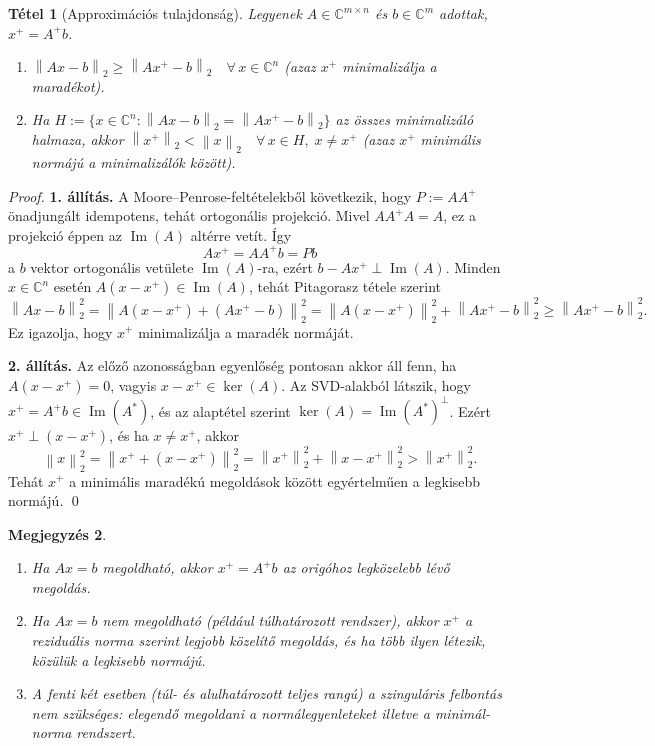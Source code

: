 \documentclass[a4paper,12pt]{article}
\theoremstyle{mydef}
\newtheorem{tetel}{Tétel}[section]
\newtheorem{megjegyzes}[tetel]{Megjegyzés}
\newcommand{\C}{\mathbb{C}}
\newcommand{\norm}[1]{\left\|#1\right\|}
\DeclareMathOperator{\Ker}{ker}
\DeclareMathOperator{\Kep}{Im}
\begin{document}
\begin{mdframed}[backgroundcolor=thmbg,linewidth=0pt,innertopmargin=8pt,innerbottommargin=8pt]
\begin{tetel}[Approximációs tulajdonság]
\label{tetel:approx}
Legyenek $A \in \C^{m\times n}$ és $b \in \C^m$ adottak, $x^+ = A^+b$.
\begin{enumerate}[noitemsep,topsep=2pt]
  \item $\norm{Ax - b}_2 \ge \norm{Ax^+ - b}_2 \quad \forall\,x \in \C^n$
        (azaz $x^+$ minimalizálja a maradékot).
  \item Ha $H := \{x \in \C^n : \norm{Ax - b}_2 = \norm{Ax^+ - b}_2\}$ az összes
        minimalizáló halmaza, akkor
        $\norm{x^+}_2 < \norm{x}_2 \quad \forall\,x \in H,\; x \ne x^+$
        (azaz $x^+$ minimális normájú a minimalizálók között).
\end{enumerate}
\end{tetel}
\end{mdframed}

\begin{proof}
\textbf{1. állítás.}
A Moore--Penrose-feltételekből következik, hogy $P:=AA^+$ önadjungált idempotens,
tehát ortogonális projekció. Mivel $AA^+A=A$, ez a projekció éppen az $\Kep(A)$ altérre
vetít. Így
\[
  Ax^+ = AA^+b = Pb
\]
a $b$ vektor ortogonális vetülete $\Kep(A)$-ra, ezért $b-Ax^+\perp\Kep(A)$.
Minden $x\in\C^n$ esetén $A(x-x^+)\in\Kep(A)$, tehát Pitagorasz tétele szerint
\[
  \norm{Ax-b}_2^2
  = \norm{A(x-x^+) + (Ax^+-b)}_2^2
  = \norm{A(x-x^+)}_2^2 + \norm{Ax^+-b}_2^2
  \ge \norm{Ax^+-b}_2^2.
\]
Ez igazolja, hogy $x^+$ minimalizálja a maradék normáját.

\textbf{2. állítás.}
Az előző azonosságban egyenlőség pontosan akkor áll fenn, ha
$A(x-x^+)=0$, vagyis $x-x^+\in\Ker(A)$. Az SVD-alakból látszik, hogy
$x^+=A^+b\in\Kep(A^*)$, és az alaptétel szerint $\Ker(A)=\Kep(A^*)^\perp$.
Ezért $x^+\perp(x-x^+)$, és ha $x\ne x^+$, akkor
\[
  \norm{x}_2^2
  = \norm{x^+ + (x-x^+)}_2^2
  = \norm{x^+}_2^2 + \norm{x-x^+}_2^2
  > \norm{x^+}_2^2.
\]
Tehát $x^+$ a minimális maradékú megoldások között egyértelműen a legkisebb normájú. \qed
\end{proof}

\begin{megjegyzes}
\leavevmode
\begin{enumerate}[noitemsep,topsep=2pt]
  \item Ha $Ax = b$ megoldható, akkor $x^+ = A^+b$ az origóhoz legközelebb lévő megoldás.
  \item Ha $Ax = b$ nem megoldható (például túlhatározott rendszer), akkor $x^+$ a
        \emph{reziduális norma} szerint legjobb közelítő megoldás, és ha több ilyen létezik,
        közülük a legkisebb normájú.
  \item A fenti két esetben (túl- és alulhatározott teljes rangú) a szinguláris felbontás
        nem szükséges: elegendő megoldani a normálegyenleteket illetve a minimál-norma rendszert.
\end{enumerate}
\end{megjegyzes}
\end{document}
